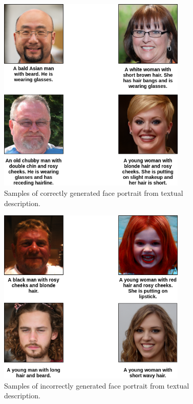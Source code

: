 \begin{figure}[H]
    \centering
    \includegraphics[width=0.8\textwidth]{images/correct-results_2.png}
    \caption{Samples of correctly generated face portrait from textual description.}
    \label{fig:correct_2}
\end{figure}

\begin{figure}[H]
    \centering
    \includegraphics[width=0.8\textwidth]{images/incorrect-results.png}
    \caption{Samples of incorrectly generated face portrait from textual description.}
    \label{fig:incorrect}
\end{figure}

